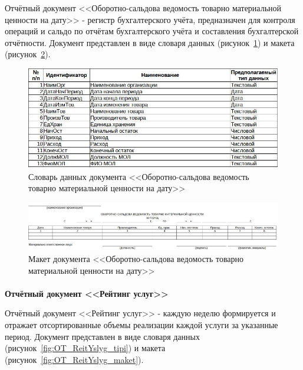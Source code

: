 \documentclass[12pt, a4paper, simple]{eskdtext}
\begin{document}
    Отчётный документ <<Оборотно-сальдова ведомость товарно материальной ценности на дату>>
    - регистр бухгалтерского учёта, предназначен для контроля операций
    и сальдо по отчётам бухгалтерского учёта и составления бухгалтерской отчётности.
    Документ представлен в виде словаря данных (рисунок~\ref{fig:OT_OborSaldVed_tipi})
    и макета (рисунок~\ref{fig:OT_OborSaldVed_maket}).

    \begin{figure}[!h]
        \centering
        \includegraphics[width=14cm]
            {_docs/ОТ_ОборСальдВед_типы.jpg}
        \caption{Словарь данных документа <<Оборотно-сальдова ведомость товарно материальной ценности на дату>>}
        \label{fig:OT_OborSaldVed_tipi}
    \end{figure}

    \begin{figure}[!h]
        \centering
        \includegraphics[width=14cm]
            {_docs/ОТ_ОборСальдВед_макет.jpg}
        \caption{Макет документа <<Оборотно-сальдова ведомость товарно материальной ценности на дату>>}
        \label{fig:OT_OborSaldVed_maket}
    \end{figure}

    \newpage
    \paragraph{} \textbf{Отчётный документ <<Рейтинг услуг>>}

    Отчётный документ <<Рейтинг услуг>>
    - каждую неделю формируется и отражает отсортированные объемы реализации каждой услуги за указанные период.
    Документ представлен в виде словаря данных (рисунок~\ref{fig:OT_ReitYslyg_tipi})
    и макета (рисунок~\ref{fig:OT_ReitYslyg_maket}).
\end{document}
